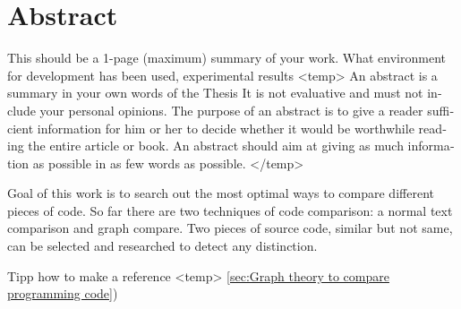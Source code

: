 \chapter{Abstract}

\begin{english} %
This should be a 1-page (maximum) summary of your work. What environment for development has been used, experimental results 
<temp>
An abstract is a summary in your own words of the Thesis It is not evaluative and must not include your personal opinions. The purpose of an abstract is to give a reader sufficient information for him or her to decide whether it would be worthwhile reading the entire article or book. An abstract should aim at giving as much information as possible in as few words as possible. 
</temp>

Goal of this work is to search out the most optimal ways to compare different pieces of code. So far there are two techniques of code comparison: a normal text comparison and graph compare. Two pieces of source code, similar but not same, can be selected and researched to detect any distinction. 

\end{english}
Tipp how to make a reference <temp>
 \ref{sec:Graph theory to compare programming code})